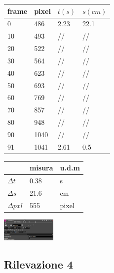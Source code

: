 \begin{tabular}{ | m{3em} | m{3em} | m{2.5em}| m{2.5em} | } 
 \hline
 \vspace{5pt} frame \vspace{5pt}  &  pixel & $t(s)$ & $s(cm)$\\ 
 \hline
 \hline
 0 & 486 & 2.23  & 22.1\\ 
 \hline
 10 & 493 & //  & //\\
 \hline
 20 & 522 & //  & //\\ 
 \hline
 30 & 564 & //  & //\\ 
 \hline
 40 & 623 & //  & //\\ 
 \hline
 50 & 693 & //  & //\\ 
 \hline
 60 & 769 & //  & //\\ 
 \hline
 70 & 857 & //  & //\\ 
 \hline
 80 & 948 & //  & //\\ 
 \hline
 90 & 1040 & //  & //\\ 
 \hline
 91 & 1041 & 2.61  & 0.5\\ 
 \hline
\end{tabular}
\quad
\begin{tabular}{ | m{3em} | m{3em} | m{1cm}| } 
 \hline
   &  misura & u.d.m \\ 
 \hline
 \hline
 $\Delta t$   &  0.38 	& s\\
 \hline
 $\Delta s$   &  21.6	& cm\\
 \hline
 $\Delta pxl$ & 555	& pixel\\
 \hline
\end{tabular}
\includegraphics[width=100px]{images/tracking_1.png}


\newpage
\subsection{Rilevazione 4}

